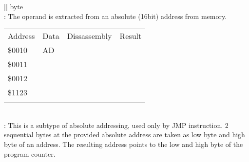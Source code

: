 \documentclass[letterpaper,10pt,english]{sphinxmanual}
\begin{document}
\begin{savenotes}\sphinxattablestart
\sphinxthistablewithglobalstyle
\centering
\begin{tabular}[t]{|*{1}{|}}
\sphinxtoprule
\sphinxstyletheadfamily 
{}\sphinxhyphen{}byte
\\
\sphinxmidrule
\sphinxtableatstartofbodyhook
\sphinxAtStartPar
{}: The operand is extracted from
an absolute (16\sphinxhyphen{}bit) address from memory.

\sphinxAtStartPar
{}


\begin{savenotes}\sphinxattablestart
\sphinxthistablewithglobalstyle
\centering
\begin{tabulary}{\linewidth}[t]{|T|T|T|T|}
\sphinxtoprule
\sphinxstyletheadfamily 
\sphinxAtStartPar
Address
&\sphinxstyletheadfamily 
\sphinxAtStartPar
Data
&\sphinxstyletheadfamily 
\sphinxAtStartPar
Dissassembly
&\sphinxstyletheadfamily 
\sphinxAtStartPar
Result
\\
\sphinxmidrule
\sphinxtableatstartofbodyhook
\sphinxAtStartPar
\$0010
&
\sphinxAtStartPar
AD
&%
&%
\\
\sphinxAtStartPar
\$0011
&
&&\\
\sphinxAtStartPar
\$0012
&
&&\\
\sphinxAtStartPar
\$1123
&
&&\\
\sphinxbottomrule
\end{tabulary}
\sphinxtableafterendhook\par
\sphinxattableend\end{savenotes}
\\
\sphinxhline
\sphinxAtStartPar
{}: This is a subtype of
absolute addressing, used only by JMP instruction. 2 sequential bytes
at the provided absolute address are taken as low byte and high byte of
an address. The resulting address points to the low and high byte of the
program counter.


\end{tabular}
\end{savenotes}
\end{document}
